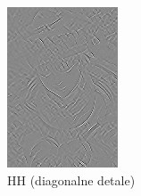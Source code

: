 \begin{figure}[ht]
\begin{minipage}[t]{0.35\linewidth}
        \includegraphics[width=\linewidth]{Rozdziały/02.Podstawy_teoretyczne/Obrazy/level_1_decomposition_HH.png}
        \caption{HH (diagonalne detale)}
        \label{fig:image45}
    \end{minipage}
\end{figure}


